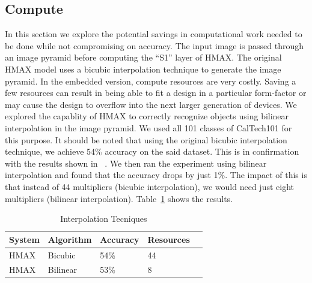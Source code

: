 \subsection{Compute}
In this section we explore the potential savings in computational work needed to be done while not compromising on accuracy. The input image 
is passed through an image pyramid before computing the ``S1'' layer of HMAX. The original HMAX model uses a bicubic interpolation technique 
to generate the image pyramid. In the embedded version, compute resources are very costly. Saving a few resources can result in being able to 
fit a design in a particular form-factor or may cause the design to overflow into the next larger generation of devices. We explored the 
capablity of HMAX to correctly recognize objects using bilinear interpolation in the image pyramid. We used all 101 classes of CalTech101 
for this purpose. It should be noted that using the original bicubic interpolation technique, we achieve 54\% accuracy on the said dataset. This is in confirmation with the results shown in ~\cite{Mutch2008}. 
We then ran the experiment using bilinear interpolation and found that the accuracy drops by just 1\%. The impact of this is that instead of 
44 multipliers (bicubic interpolation), we would need just eight multipliers (bilinear interpolation). Table~\ref{table:compute} shows the 
results. 

\begin{table}[h]
\renewcommand{\arraystretch}{1.3}
\caption {Interpolation Tecniques}
\label{table:compute}
\begin{tabular}{lllll}
 System & Algorithm & Accuracy & Resources\\\hline
 HMAX	& Bicubic   & 54\% & 44\\\hline
 HMAX   & Bilinear  & 53\% & 8\\\hline
\end{tabular}
\end{table}
